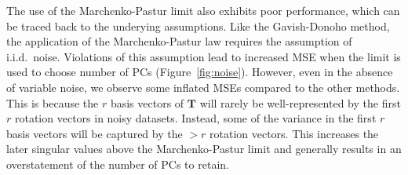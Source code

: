 \documentclass[10pt,letterpaper]{article}
\begin{document}
The use of the Marchenko-Pastur limit also exhibits poor performance, which can be traced back to the underying assumptions.
Like the Gavish-Donoho method, the application of the Marchenko-Pastur law requires the assumption of i.i.d.\ noise.
Violations of this assumption lead to increased MSE when the limit is used to choose number of PCs (Figure~\ref{fig:noise}).
However, even in the absence of variable noise, we observe some inflated MSEs compared to the other methods.
This is because the $r$ basis vectors of $\mathbf{T}$ will rarely be well-represented by the first $r$ rotation vectors in noisy datasets.
Instead, some of the variance in the first $r$ basis vectors will be captured by the $>r$ rotation vectors.
This increases the later singular values above the Marchenko-Pastur limit and generally results in an overstatement of the number of PCs to retain. 



\end{document}
